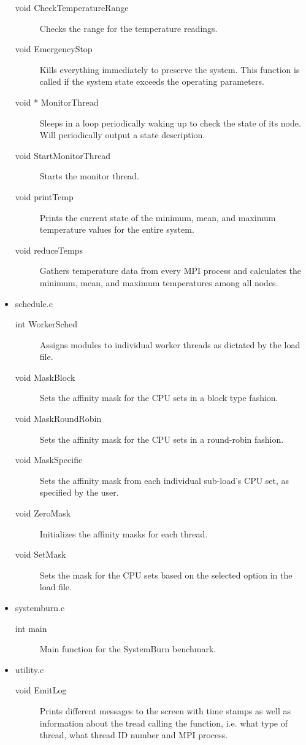 \begin{itemize}
\begin{description}
		\item [void CheckTemperatureRange] Checks the range for the temperature readings. 
		\item [void EmergencyStop] Kills everything immediately to preserve the system. This function is called if the system state exceeds the operating parameters.
		\item [void * MonitorThread] Sleeps in a loop periodically waking up to check the state of its node. Will periodically output a state description. 
		\item [void StartMonitorThread] Starts the monitor thread.
		\item [void printTemp] Prints the current state of the minimum, mean, and maximum temperature values for the entire system.
		\item [void reduceTemps] Gathers temperature data from every MPI process and calculates the minimum, mean, and maximum temperatures among all nodes.
	\end{description}
	\item schedule.c
	\begin{description}
		\item [int WorkerSched] Assigns modules to individual worker threads as dictated by the load file. 
		\item [void MaskBlock] Sets the affinity mask for the CPU sets in a block type fashion. 
		\item [void MaskRoundRobin] Sets the affinity mask for the CPU sets in a round-robin fashion.
		\item [void MaskSpecific] Sets the affinity mask from each individual sub-load's CPU set, as specified by the user.
		\item [void ZeroMask] Initializes the affinity masks for each thread.
		\item [void SetMask] Sets the mask for the CPU sets based on the selected option in the load file. 
	\end{description}
	\item systemburn.c
	\begin{description}
		\item [int main] Main function for the SystemBurn benchmark. 
	\end{description}
	\item utility.c
	\begin{description}
		\item [void EmitLog] Prints different messages to the screen with time stamps as well as information about the tread calling the function, i.e. what type of thread, what thread ID number and MPI process.   

\end{description}
\end{itemize}
